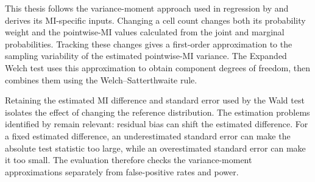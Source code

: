 This thesis follows the variance-moment approach used in regression by
\citet{panwall2002} and derives its MI-specific inputs. Changing a cell
count changes both its probability weight and the pointwise-MI values
calculated from the joint and marginal probabilities. Tracking these
changes gives a first-order approximation to the sampling variability of
the estimated pointwise-MI variance. The Expanded Welch test uses this approximation
to obtain component degrees of freedom, then combines them using the
Welch--Satterthwaite rule.

Retaining the estimated MI difference and standard error used by the Wald test isolates
the effect of changing the reference distribution.
The estimation problems identified by \citet{paninski2003} remain relevant:
residual bias can shift the estimated difference. For a fixed estimated
difference, an underestimated standard error can make the absolute test
statistic too large, while an overestimated standard error can make it
too small. The evaluation therefore
checks the variance-moment approximations separately from false-positive
rates and power.
